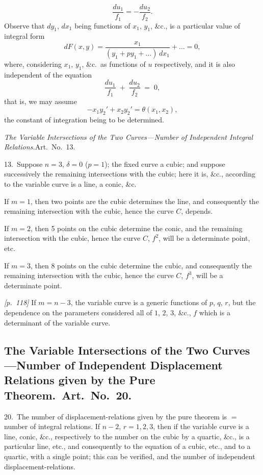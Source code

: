 \documentclass[11pt,a4paper]{book}
\begin{document}
\[
\frac{du_1}{f_1} = -\frac{du_2}{f_2}.
\]
Observe that $dy_1$, $dx_1$ being functions of $x_1$, $y_1$, \&c., is a particular value of integral form
\[
dF(x, y) = \frac{x_1}{(y_1 + p y_1 + ...)\,dx_1} + \ldots = 0,
\]
where, considering $x_1$, $y_1$, \&c.\ as functions of $u$ respectively, and it is also independent of the equation
\[
\frac{du_1}{f_1} \;+\; \frac{du_2}{f_2} \;=\; 0,
\]
that is, we may assume
\[
- x_1 y_2' + x_2 y_2' = \theta(x_1, x_2),
\]
the constant of integration being to be determined.

\textit{The Variable Intersections of the Two Curves---Number of Independent Integral Relations.}\quad Art.\ No.~13.

13.\ Suppose $n = 3$, $\delta = 0$ ($p = 1$); the fixed curve a cubic; and suppose successively the remaining intersections with the cubic; here it is, $\&$c., according to the variable curve is a line, a conic, \&c.

If $m = 1$, then two points are the cubic determines the line, and consequently the remaining intersection with the cubic, hence the curve $C$, depends.

If $m = 2$, then 5 points on the cubic determine the conic, and the remaining intersection with the cubic, hence the curve $C$, $f^2$, will be a determinate point, etc.

If $m = 3$, then 8 points on the cubic determine the cubic, and consequently the remaining intersection with the cubic, hence the curve $C$, $f^3$, will be a determinate point.

\bigskip\noindent\textit{[p.~118]} If $m = n - 3$, the variable curve is a generic functions of $p$, $q$, $r$, but the dependence on the parameters considered all of $1$, $2$, $3$, \&c., $f$ which is a determinant of the variable curve.

\subsection*{The Variable Intersections of the Two Curves---Number of Independent Displacement Relations given by the Pure Theorem.\ Art.\ No.~20.}

20.\ The number of displacement-relations given by the pure theorem is $=$ number of integral relations. If $n - 2$, $r = 1, 2, 3$, then if the variable curve is a line, conic, \&c., respectively to the number on the cubic by a quartic, \&c., is a particular line, etc., and consequently to the equation of a cubic, etc., and to a quartic, with a single point; this can be verified, and the number of independent displacement-relations.
\end{document}
